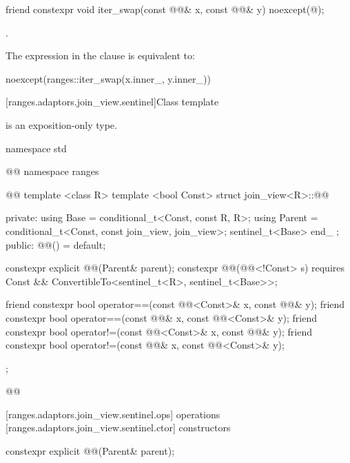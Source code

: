 \begin{itemdecl}
friend constexpr void iter_swap(const @@& x, const @@& y)
  noexcept(@\seebelow@);
\end{itemdecl}

\begin{itemdescr}
\pnum
\returns {}.

\pnum
\remarks The expression in the  clause is equivalent to:
\begin{codeblock}
noexcept(ranges::iter_swap(x.inner_, y.inner_))
\end{codeblock}
\end{itemdescr}

[ranges.adaptors.join_view.sentinel]{Class template }

\pnum
{} is an exposition-only type.

\begin{codeblock}
namespace std { @@ namespace ranges { @@
  template <class R>
  template <bool Const>
  struct join_view<R>::@@ {
  private:
    using Base = conditional_t<Const, const R, R>;
    using Parent = conditional_t<Const, const join_view, join_view>;
    sentinel_t<Base> end_ {};
  public:
    @@() = default;

    constexpr explicit @@(Parent& parent);
    constexpr @@(@@<!Const> s) requires Const &&
        ConvertibleTo<sentinel_t<R>, sentinel_t<Base>>;

    friend constexpr bool operator==(const @@<Const>& x, const @@& y);
    friend constexpr bool operator==(const @@& x, const @@<Const>& y);
    friend constexpr bool operator!=(const @@<Const>& x, const @@& y);
    friend constexpr bool operator!=(const @@& x, const @@<Const>& y);
  };
}}@\removed{\}\}}@
\end{codeblock}

[ranges.adaptors.join_view.sentinel.ops]{ operations}
[ranges.adaptors.join_view.sentinel.ctor]{ constructors}

\begin{itemdecl}
constexpr explicit @@(Parent& parent);
\end{itemdecl}

